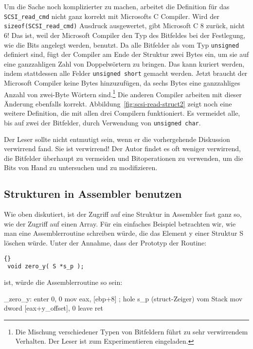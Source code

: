 Um die Sache noch komplizierter zu machen, arbeitet die Definition
f\"{u}r das \lstinline|SCSI_read_cmd| nicht ganz korrekt mit Microsofts
C\@ {} Compiler. Wird der
\lstinline|sizeof(SCSI_read_cmd)| Ausdruck ausgewertet, gibt
Microsoft C 8 zur\"{u}ck, nicht 6! Das ist, weil der Microsoft Compiler
den Typ des Bitfeldes bei der Festlegung, wie die Bits angelegt
werden, benutzt. Da alle Bitfelder als vom Typ \lstinline|unsigned|
definiert sind, f\"{u}gt der Compiler am Ende der Struktur zwei Bytes
ein, um sie auf eine ganzzahligen Zahl von Doppelw\"{o}rtern zu bringen.
Das kann kuriert werden, indem stattdessen alle Felder
\lstinline|unsigned short| gemacht werden. Jetzt braucht der
Microsoft Compiler keine Bytes hinzuzuf\"{u}gen, da sechs Bytes eine
ganzzahliges Anzahl von zwei-Byte W\"{o}rtern sind.\footnote{Die
Mischung verschiedener Typen von Bitfeldern f\"{u}hrt zu sehr
verwirrendem Verhalten. Der Leser ist zum Experimentieren
eingeladen.} Die anderen Compiler arbeiten mit dieser \"{A}nderung
ebenfalls korrekt. Abbildung~\ref{fig:scsi-read-struct2} zeigt noch
eine weitere Definition, die mit allen drei Compilern funktioniert.
Es vermeidet alle, bis auf zwei der Bitfelder, durch Verwendung von
\lstinline|unsigned char|. 

Der Leser sollte nicht entmutigt sein, wenn er die vorhergehende
Diskussion verwirrend fand. Sie ist verwirrend! Der Autor findet es
oft weniger verwirrend, die Bitfelder \"{u}berhaupt zu vermeiden und
Bitoperationen zu verwenden, um die Bits von Hand zu untersuchen und
zu modifizieren.



\subsection{Strukturen in Assembler benutzen}

Wie oben diskutiert, ist der Zugriff auf eine Struktur in Assembler
fast ganz so, wie der Zugriff auf einen Array. F\"{u}r ein einfaches
Beispiel betrachten wir, wie man eine Assemblerroutine schreiben
w\"{u}rde, die das Element {\code y} einer Struktur {\code S} l\"{o}schen
w\"{u}rde. Unter der Annahme, dass der Prototyp der Routine:
\begin{lstlisting}[stepnumber=0]{}
 void zero_y( S *s_p );
\end{lstlisting}
\noindent ist, w\"{u}rde die Assemblerroutine so sein:
\begin{AsmCodeListing}[numbers=left]
 _zero_y:
     enter  0, 0
     mov    eax, [ebp+8]      ; hole s_p (struct-Zeiger) vom Stack
     mov    dword [eax+y_offset], 0
     leave
     ret
\end{AsmCodeListing}

